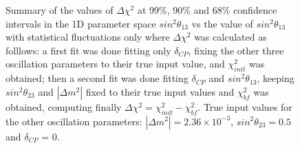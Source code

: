 \begin{center}
\begin{figure}[htb]
\begin{minipage}[t]{0.46\linewidth}
\caption {
    Summary of the values of $\Delta\chi^{2}$ at 99\%, 90\% and 68\% confidence intervals in the 1D parameter space $sin^{2}\theta_{13}$ vs the value of $sin^{2}\theta_{13}$ with statistical fluctuations only where $\Delta\chi^{2}$ was calculated as folllows: a first fit was done fitting only $\delta_{CP}$, fixing the other three oscillation parameters to their true input value, and $\chi^{2}_{init}$ was obtained; then a second fit was done fitting $\delta_{CP}$ and $sin^{2}\theta_{13}$, keeping $sin^{2}\theta_{23}$ and $|\Delta m^{2}|$ fixed to their true input values and $\chi^{2}_{bf}$ was obtained, computing finally $\Delta\chi^{2} = \chi^{2}_{init} - \chi^{2}_{bf}$.
True input values for the other oscillation parameters:
$|\Delta m^{2}| = 2.36 \times 10^{-3}$,
  $sin^{2}\theta_{23} = 0.5$ and
        $\delta_{CP}$   = 0.
	}
\label{fig:cov_1D_deltacp_theta13_all}
\end{minipage}
\end{figure}
\end{center}


